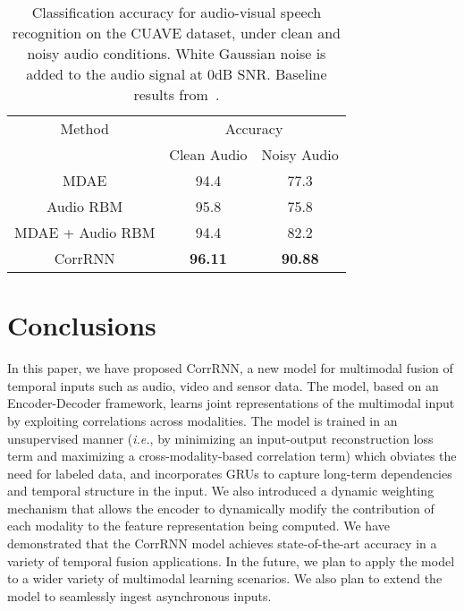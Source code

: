 \documentclass[10pt,twocolumn,letterpaper]{article}
\begin{document}
\begin{table}
\begin{center}

\begin{tabular}{|c|c|c|}
\hline
Method & \multicolumn{2}{c|}{Accuracy } \\
\cline{2-3}
& Clean Audio & Noisy Audio \\
\hline
MDAE & 94.4 & 77.3 \\
\hline
Audio RBM & 95.8& 75.8\\
\hline
MDAE + Audio RBM & 94.4 & 82.2 \\ 
\hline
CorrRNN & \textbf{96.11} & \textbf{90.88} \\
\hline
\end{tabular}
\end{center}
\caption{Classification accuracy for audio-visual speech recognition on the CUAVE dataset, under clean and noisy audio conditions. White Gaussian noise is added to the audio signal at 0dB SNR. Baseline results from~\cite{ngiam2011multimodal}.}
\label{tbl:audio-visual3}
\end{table}


\section{Conclusions}
\label{sec:conclude}

In this paper, we have proposed CorrRNN, a new model for multimodal fusion of temporal inputs such as audio, video and sensor data. The model, based on an Encoder-Decoder framework, learns joint representations of the multimodal input by exploiting correlations across modalities. The model is trained in an unsupervised manner (\textit{i.e.}, by minimizing an input-output reconstruction loss term and maximizing a cross-modality-based correlation term) which obviates the need for labeled data, and incorporates GRUs to capture long-term dependencies and temporal structure in the input. We also introduced a dynamic weighting mechanism that allows the encoder to dynamically modify the contribution of each modality to the feature representation being computed.  We have demonstrated that the CorrRNN model achieves state-of-the-art accuracy in a variety of temporal fusion applications. In the future, we plan to apply the model to a wider variety of multimodal learning scenarios. We also plan to extend the model to seamlessly ingest asynchronous inputs.

 








{\small


}
\end{document}
